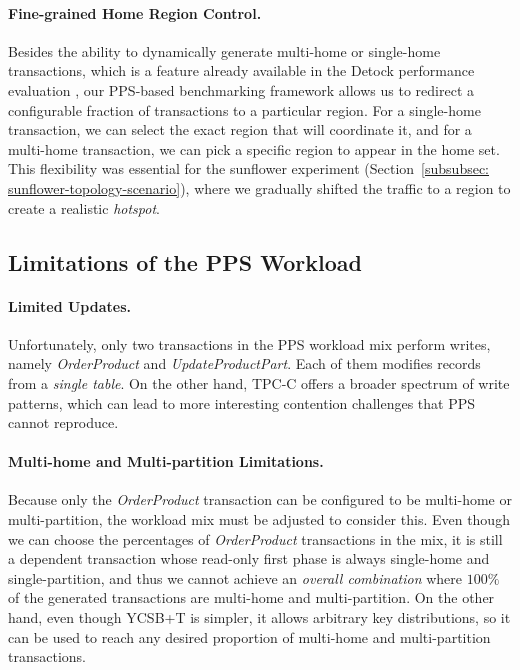 \paragraph{Fine-grained Home Region Control.}
Besides the ability to dynamically generate multi-home or single-home transactions, which is a feature already available in the Detock performance evaluation \cite{nguyen2023detock}, our PPS-based benchmarking framework allows us to redirect a configurable fraction of transactions to a particular region. For a single-home transaction, we can select the exact region that will coordinate it, and for a multi-home transaction, we can pick a specific region to appear in the home set. This flexibility was essential for the sunflower experiment (Section~\ref{subsubsec: sunflower-topology-scenario}), where we gradually shifted the traffic to a region to create a realistic \textit{hotspot}.

\subsection{Limitations of the PPS Workload}
\label{subsec: limitations-of-the-pps-workload}
\paragraph{Limited Updates.}
Unfortunately, only two transactions in the PPS workload mix perform writes, namely \textit{OrderProduct} and \textit{UpdateProductPart}. Each of them modifies records from a \textit{single table}. On the other hand, TPC-C offers a broader spectrum of write patterns, which can lead to more interesting contention challenges that PPS cannot reproduce.

\paragraph{Multi-home and Multi-partition Limitations.}
Because only the \textit{OrderProduct} transaction can be configured to be multi-home or multi-partition, the workload mix must be adjusted to consider this. Even though we can choose the percentages of \textit{OrderProduct} transactions in the mix, it is still a dependent transaction whose read-only first phase is always single-home and single-partition, and thus we cannot achieve an \textit{overall combination} where $100\%$ of the generated transactions are multi-home and multi-partition. On the other hand, even though YCSB+T is simpler, it allows arbitrary key distributions, so it can be used to reach any desired proportion of multi-home and multi-partition transactions.